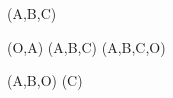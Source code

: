 \tkzDefTriangleCenter[circum](A,B,C) 

\tkzDrawCircle(O,A)
\tkzDrawPolygon(A,B,C)
\tkzDrawPoints(A,B,C,O)

\tkzLabelPoints[below](A,B,O)
\tkzLabelPoints[above](C)
